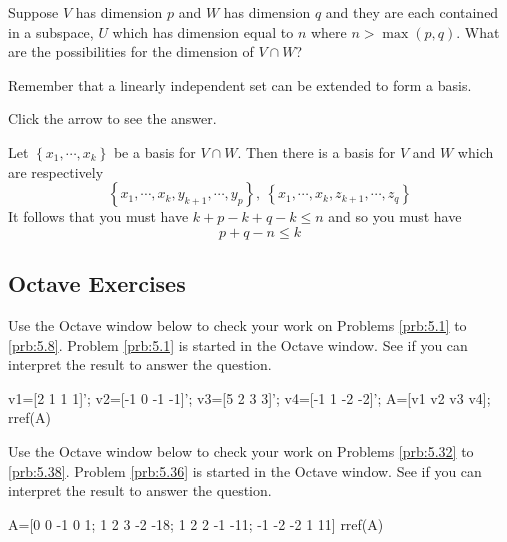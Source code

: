 \documentclass{ximera}
\begin{document}
\begin{problem}\label{prb:5.29} Suppose $V$ has dimension $p$ and $W$ has dimension $q$ and they
are each contained in a subspace, $U$ which has dimension equal to $n$ where
$n>\max \left( p,q\right).$ What are the possibilities for the dimension of
$V\cap W$? 

\begin{hint}
Remember that a linearly independent set can be extended to form a basis.
\end{hint}

Click the arrow to see the answer.
\begin{expandable}
Let $\left\{ x_{1},\cdots ,x_{k}\right\} $ be a
basis for $V\cap W.$ Then there is a basis for $V$ and $W$ which are
respectively
\[
\left\{ x_{1},\cdots ,x_{k},y_{k+1},\cdots ,y_{p}\right\} ,\ \left\{
x_{1},\cdots ,x_{k},z_{k+1},\cdots ,z_{q}\right\}
\]
It follows that you must have $k+p-k+q-k\leq n$ and so you must have
\[
p+q-n\leq k
\]
\end{expandable}
\end{problem}



\subsection*{Octave Exercises}
\begin{problem}\label{oct:find_dim_span_vectors}
Use the Octave window below to check your work on Problems \ref{prb:5.1} to \ref{prb:5.8}.  Problem \ref{prb:5.1} is started in the Octave window.  See if you can interpret the result to answer the question.

v1=[2 1 1 1]';
v2=[-1 0 -1 -1]';
v3=[5 2 3 3]';
v4=[-1 1 -2 -2]';
A=[v1 v2 v3 v4];
rref(A)
\end{problem}

\begin{problem}\label{oct:find_basis_important_subspaces}
Use the Octave window below to check your work on Problems \ref{prb:5.32} to \ref{prb:5.38}.  Problem \ref{prb:5.36} is started in the Octave window.  See if you can interpret the result to answer the question.

A=[0 0 -1 0 1; 1 2 3 -2 -18; 1 2 2 -1 -11; -1 -2 -2 1 11]
rref(A)
\end{problem}
\end{document}
